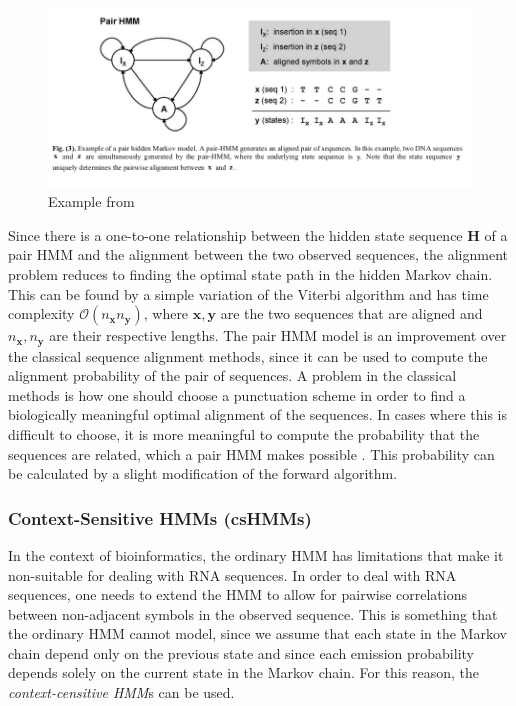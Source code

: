 \documentclass{article}
\begin{document}
\begin{figure}
    \centering
    \includegraphics[width = \textwidth]{examplePairHMMYoon.png}
    \caption{Example from \cite{Yoon2009}}
    \label{fig:Yoon2009PairHMMExample}
\end{figure}

Since there is a one-to-one relationship between the hidden state sequence $\mathbf{H}$ of a pair HMM and the alignment between the two observed sequences, the alignment problem reduces to finding the optimal state path in the hidden Markov chain. This can be found by a simple variation of the Viterbi algorithm and has time complexity $\mathcal{O}(n_\mathbf{x}n_\mathbf{y})$, where $\mathbf{x}, \mathbf{y}$ are the two sequences that are aligned and $n_\mathbf{x}, n_\mathbf{y}$ are their respective lengths. The pair HMM model is an improvement over the classical sequence alignment methods, since it can be used to compute the alignment probability of the pair of sequences. A problem in the classical methods is how one should choose a punctuation scheme in order to find a biologically meaningful optimal alignment of the sequences. In cases where this is difficult to choose, it is more meaningful to compute the probability that the sequences are related, which a pair HMM makes possible \cite{Yoon2009}. This probability can be calculated by a slight modification of the forward algorithm. 

\subsubsection{Context-Sensitive HMMs (csHMMs)}
In the context of bioinformatics, the ordinary HMM has limitations that make it non-suitable for dealing with RNA sequences. In order to deal with RNA sequences, one needs to extend the HMM to allow for pairwise correlations between non-adjacent symbols in the observed sequence. This is something that the ordinary HMM cannot model, since we assume that each state in the Markov chain depend only on the previous state and since each emission probability depends solely on the current state in the Markov chain. For this reason, the \textit{context-censitive HMM}s can be used.
\end{document}
